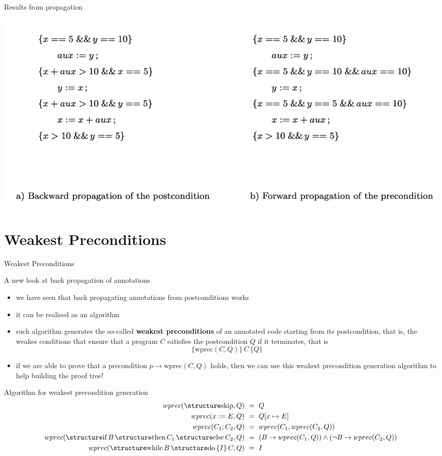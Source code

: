 \documentclass[aspectratio=169]{beamer}
\begin{document}
\begin{slide}{Results from propagation}
\begin{center}
\includegraphics[scale=0.5]{images/ex_code_prop}  
\end{center}
  
\end{slide}

\section*{Weakest Preconditions}

\begin{slide}{Weakest Preconditions}
  \begin{block}{A new look at back propagation of annotations}
  \begin{itemize}
  \item we have seen that back propagating annotations from postconditions works
  \item it can be realised as an algorithm
  \item such algorithm generates the so-called \textbf{weakest preconditions} of an annotated code starting from its postcondition, that is, the weakes conditions that ensure that a program $C$ satisfies the postcondition $Q$ if it terminates, that is $$\{\mathrm{wprec}(C,Q)\}\,C\,\{Q\}$$
  \item if we are able to prove that a precondition $p \to \mathrm{wprec}(C,Q)$ holds, then we can use this weakest precondition generation algorithm to help building the proof tree!
  \end{itemize}
  \end{block}
\end{slide}

\begin{slide}{Algorithm for weakest precondition generation}
  \begin{align*}
  wprec(\kw{skip},Q) & ~=~ Q\\
  wprec(x := E,Q)    & ~=~Q[x \mapsto E]\\
  wprec(C_1;C_2,Q)   & ~=~ wprec(C_1,wprec(C_2,Q))\\
  wprec(\kw{if}\,B\,\kw{then}\,C_1\,\kw{else}\,C_2,Q) & ~=~ (B \to wprec(C_1,Q)) \land (\neg B \to wprec(C_2,Q))\\
  wprec(\kw{while}\,B\,\kw{do}\,\{I\}\,C,Q) & ~=~ I
\end{align*}
\end{slide}
\end{document}
